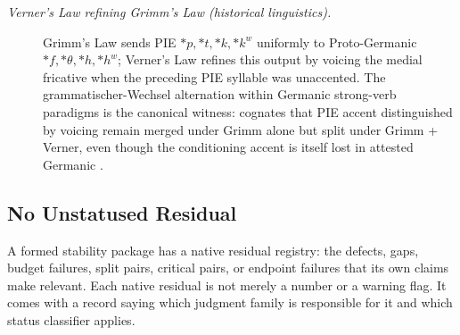 \documentclass[11pt]{article}
\theoremstyle{definition}
\begin{document}
\begin{description}
\item[\emph{Verner's Law refining Grimm's Law (historical
linguistics).}]
Grimm's Law sends PIE \({*}p,{*}t,{*}k,{*}k^w\) uniformly to
Proto-Germanic \({*}f,{*}\theta,{*}h,{*}h^w\); Verner's Law refines
this output by voicing the
medial fricative when the preceding PIE syllable was unaccented.  The
grammatischer-Wechsel alternation within Germanic strong-verb
paradigms is the canonical witness: cognates that PIE accent
distinguished by voicing remain merged under Grimm alone but split
under Grimm + Verner, even though the conditioning accent is itself
lost in attested Germanic
\citep{Verner1877AusnahmeLautverschiebung}.
\end{description}

\subsection{No Unstatused Residual}\label{sec:stability:no-unstatused-residual}

A formed stability package has a native residual registry: the
defects, gaps, budget failures, split pairs, critical pairs, or
endpoint failures that its own claims make relevant.  Each native
residual is not merely a number or a warning flag.  It comes with a
record saying which judgment family is responsible for it and which
status classifier applies.
\end{document}
